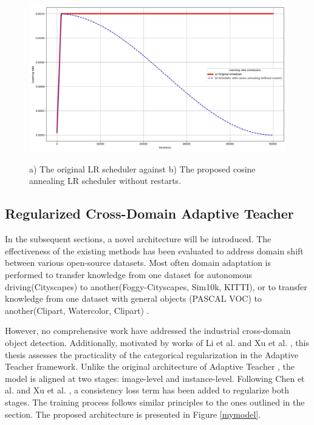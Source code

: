 \begin{figure}[htb]
	\begin{center}
		\includegraphics[width=14cm]{./LR.jpg}
	\end{center}
	\caption{a) The original LR scheduler against b) The proposed cosine annealing LR scheduler without restarts.}
	\begin{center}
		\label{annealing}
	\end{center}
\end{figure}
\FloatBarrier

\subsection{Regularized Cross-Domain Adaptive Teacher}
\label{mainExperiments} 
In the subsequent sections, a novel architecture will be introduced. The effectiveness of the existing methods has been evaluated to address domain shift  between various open-source datasets. Most often domain adaptation is performed to transfer knowledge from one dataset for autonomous driving(Cityscapes) to another(Foggy-Cityscapes, Sim10k, KITTI), or to transfer knowledge from one dataset with general objects (PASCAL VOC) to another(Clipart, Watercolor, Clipart) \cite{Oza2021}.  

However, no comprehensive work have addressed the industrial cross-domain object detection. Additionally, motivated by works of Li et al. \cite{Li2021} and Xu et al. \cite{Xu2020}, this thesis assesses the practicality of the categorical regularization in the Adaptive Teacher framework. Unlike the original architecture of Adaptive Teacher \cite{Li2021}, the model is aligned at two stages:  image-level and instance-level. Following Chen et al. \cite{Chen2018} and Xu et al. \cite{Xu2020}, a consistency loss term has been added to regularize both stages. The training process follows similar principles to the ones outlined in the  section. The proposed architecture is presented in Figure \ref{mymodel}. 

